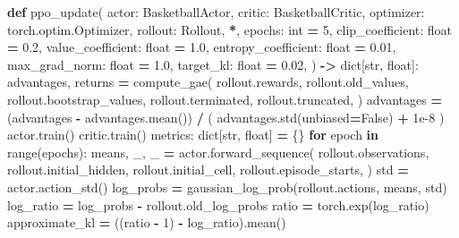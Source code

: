 \documentclass[
  chinese,
  11pt,
  letterpaper,
]{article}
\newenvironment{Shaded}{\begin{snugshade}}{\end{snugshade}}
\newcommand{\BuiltInTok}[1]{#1}
\newcommand{\ControlFlowTok}[1]{\textcolor[rgb]{0.13,0.29,0.53}{\textbf{#1}}}
\newcommand{\DecValTok}[1]{\textcolor[rgb]{0.00,0.00,0.81}{#1}}
\newcommand{\FloatTok}[1]{\textcolor[rgb]{0.00,0.00,0.81}{#1}}
\newcommand{\KeywordTok}[1]{\textcolor[rgb]{0.13,0.29,0.53}{\textbf{#1}}}
\newcommand{\NormalTok}[1]{#1}
\newcommand{\OperatorTok}[1]{\textcolor[rgb]{0.81,0.36,0.00}{\textbf{#1}}}
\newcommand{\VariableTok}[1]{\textcolor[rgb]{0.00,0.00,0.00}{#1}}
\renewenvironment{Shaded}{\par\smallskip}{\par\smallskip}
\begin{document}
\begin{Shaded}
\begin{Highlighting}[]
\KeywordTok{def}\NormalTok{ ppo\_update(}
\NormalTok{    actor: BasketballActor,}
\NormalTok{    critic: BasketballCritic,}
\NormalTok{    optimizer: torch.optim.Optimizer,}
\NormalTok{    rollout: Rollout,}
    \OperatorTok{*}\NormalTok{,}
\NormalTok{    epochs: }\BuiltInTok{int} \OperatorTok{=} \DecValTok{5}\NormalTok{,}
\NormalTok{    clip\_coefficient: }\BuiltInTok{float} \OperatorTok{=} \FloatTok{0.2}\NormalTok{,}
\NormalTok{    value\_coefficient: }\BuiltInTok{float} \OperatorTok{=} \FloatTok{1.0}\NormalTok{,}
\NormalTok{    entropy\_coefficient: }\BuiltInTok{float} \OperatorTok{=} \FloatTok{0.01}\NormalTok{,}
\NormalTok{    max\_grad\_norm: }\BuiltInTok{float} \OperatorTok{=} \FloatTok{1.0}\NormalTok{,}
\NormalTok{    target\_kl: }\BuiltInTok{float} \OperatorTok{=} \FloatTok{0.02}\NormalTok{,}
\NormalTok{) }\OperatorTok{{-}\textgreater{}} \BuiltInTok{dict}\NormalTok{[}\BuiltInTok{str}\NormalTok{, }\BuiltInTok{float}\NormalTok{]:}
\NormalTok{    advantages, returns }\OperatorTok{=}\NormalTok{ compute\_gae(}
\NormalTok{        rollout.rewards,}
\NormalTok{        rollout.old\_values,}
\NormalTok{        rollout.bootstrap\_values,}
\NormalTok{        rollout.terminated,}
\NormalTok{        rollout.truncated,}
\NormalTok{    )}
\NormalTok{    advantages }\OperatorTok{=}\NormalTok{ (advantages }\OperatorTok{{-}}\NormalTok{ advantages.mean()) }\OperatorTok{/}\NormalTok{ (}
\NormalTok{        advantages.std(unbiased}\OperatorTok{=}\VariableTok{False}\NormalTok{) }\OperatorTok{+} \FloatTok{1e{-}8}
\NormalTok{    )}
\NormalTok{    actor.train()}
\NormalTok{    critic.train()}
\NormalTok{    metrics: }\BuiltInTok{dict}\NormalTok{[}\BuiltInTok{str}\NormalTok{, }\BuiltInTok{float}\NormalTok{] }\OperatorTok{=}\NormalTok{ \{\}}
    \ControlFlowTok{for}\NormalTok{ epoch }\KeywordTok{in} \BuiltInTok{range}\NormalTok{(epochs):}
\NormalTok{        means, \_, \_ }\OperatorTok{=}\NormalTok{ actor.forward\_sequence(}
\NormalTok{            rollout.observations,}
\NormalTok{            rollout.initial\_hidden,}
\NormalTok{            rollout.initial\_cell,}
\NormalTok{            rollout.episode\_starts,}
\NormalTok{        )}
\NormalTok{        std }\OperatorTok{=}\NormalTok{ actor.action\_std()}
\NormalTok{        log\_probs }\OperatorTok{=}\NormalTok{ gaussian\_log\_prob(rollout.actions, means, std)}
\NormalTok{        log\_ratio }\OperatorTok{=}\NormalTok{ log\_probs }\OperatorTok{{-}}\NormalTok{ rollout.old\_log\_probs}
\NormalTok{        ratio }\OperatorTok{=}\NormalTok{ torch.exp(log\_ratio)}
\NormalTok{        approximate\_kl }\OperatorTok{=}\NormalTok{ ((ratio }\OperatorTok{{-}} \DecValTok{1}\NormalTok{) }\OperatorTok{{-}}\NormalTok{ log\_ratio).mean()}

\end{Highlighting}
\end{Shaded}
\end{document}
